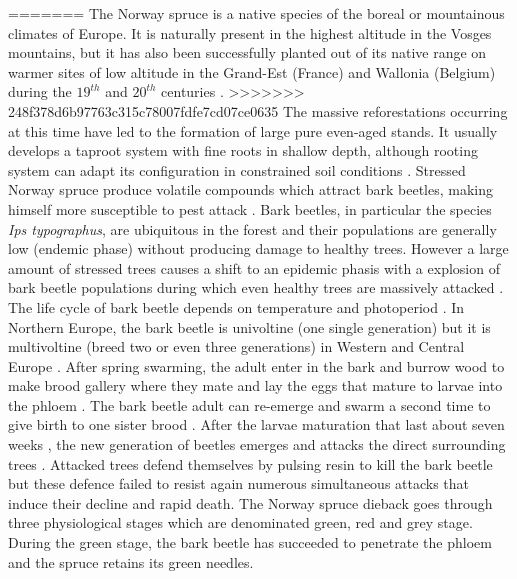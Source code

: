 \documentclass[3p,procedia]{elsarticle}
\begin{document}
=======
The Norway spruce is a native species of the boreal or mountainous climates of Europe.
It is naturally present in the highest altitude in the Vosges mountains, but it has also been successfully planted out of its native range on warmer sites of low altitude in the Grand-Est (France) and Wallonia (Belgium) during the $19^{th}$ and $20^{th}$ centuries \citep{Noirfalise_1975,guinier_trois_1959}.
>>>>>>> 248f378d6b97763c315c78007fdfe7cd07ce0635
The massive reforestations occurring at this time have led to the formation of large pure even-aged stands.
It usually develops a taproot system with fine roots in shallow depth, although rooting system can adapt its configuration in constrained soil conditions \citep{puhe_roots_2003,kostler_1968}.    
Stressed Norway spruce produce volatile compounds which attract bark beetles, making himself more susceptible to pest attack \citep{netherer_waterlimiting_2015,netherer_interactions_2021}.
Bark beetles, in particular the species \textit{Ips typographus}, are ubiquitous in the forest and their populations are generally low (endemic phase) without producing damage to healthy trees. 
However a large amount of stressed trees causes a shift to an epidemic phasis with a explosion of bark beetle populations during which even healthy trees are massively attacked \citep{kautz_individual_2014}.
The life cycle of bark beetle depends on temperature and photoperiod \citep{annila_influence_1969, baier_phenipscomprehensive_2007}.
In Northern Europe, the bark beetle is univoltine (one single generation) but it is multivoltine (breed two or even three generations) in Western and Central Europe \citep{annila_influence_1969}.
After spring swarming, the adult enter in the bark and burrow wood to make brood gallery where they mate and lay the eggs that mature to larvae into the phloem \citep{hlasny_bark_2021}.
The bark beetle adult can re-emerge and swarm a second time to give birth to one sister brood \citep{zolubas_1995}.
After the larvae maturation that last about seven weeks \citep{baier_phenipscomprehensive_2007}, the new generation of beetles emerges and attacks the direct surrounding trees \citep{zolubas_1995}.
Attacked trees defend themselves by pulsing resin to kill the bark beetle but these defence failed to resist again numerous simultaneous attacks that induce their decline and rapid death.
The Norway spruce dieback goes through three physiological stages which are denominated green, red and grey stage.
During the green stage, the bark beetle has succeeded to penetrate the phloem and the spruce retains its green needles. 
\end{document}
